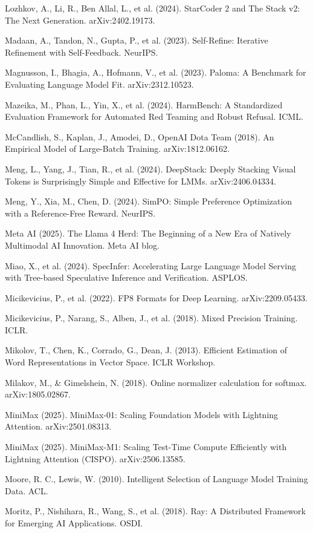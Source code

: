 {\begin{enumerate}[leftmargin=*,itemsep=1pt,label={[\arabic*]}]
\item Lozhkov, A., Li, R., Ben Allal, L., et al. (2024). StarCoder 2 and The Stack v2: The Next Generation. arXiv:2402.19173.
\item Madaan, A., Tandon, N., Gupta, P., et al. (2023). Self-Refine: Iterative Refinement with Self-Feedback. NeurIPS.
\item Magnusson, I., Bhagia, A., Hofmann, V., et al. (2023). Paloma: A Benchmark for Evaluating Language Model Fit. arXiv:2312.10523.
\item Mazeika, M., Phan, L., Yin, X., et al. (2024). HarmBench: A Standardized Evaluation Framework for Automated Red Teaming and Robust Refusal. ICML.
\item McCandlish, S., Kaplan, J., Amodei, D., OpenAI Dota Team (2018). An Empirical Model of Large-Batch Training. arXiv:1812.06162.
\item Meng, L., Yang, J., Tian, R., et al. (2024). DeepStack: Deeply Stacking Visual Tokens is Surprisingly Simple and Effective for LMMs. arXiv:2406.04334.
\item Meng, Y., Xia, M., Chen, D. (2024). SimPO: Simple Preference Optimization with a Reference-Free Reward. NeurIPS.
\item Meta AI (2025). The Llama 4 Herd: The Beginning of a New Era of Natively Multimodal AI Innovation. Meta AI blog.
\item Miao, X., et al. (2024). SpecInfer: Accelerating Large Language Model Serving with Tree-based Speculative Inference and Verification. ASPLOS.
\item Micikevicius, P., et al. (2022). FP8 Formats for Deep Learning. arXiv:2209.05433.
\item Micikevicius, P., Narang, S., Alben, J., et al. (2018). Mixed Precision Training. ICLR.
\item Mikolov, T., Chen, K., Corrado, G., Dean, J. (2013). Efficient Estimation of Word Representations in Vector Space. ICLR Workshop.
\item Milakov, M., \& Gimelshein, N. (2018). Online normalizer calculation for softmax. arXiv:1805.02867.
\item MiniMax (2025). MiniMax-01: Scaling Foundation Models with Lightning Attention. arXiv:2501.08313.
\item MiniMax (2025). MiniMax-M1: Scaling Test-Time Compute Efficiently with Lightning Attention (CISPO). arXiv:2506.13585.
\item Moore, R. C., Lewis, W. (2010). Intelligent Selection of Language Model Training Data. ACL.
\item Moritz, P., Nishihara, R., Wang, S., et al. (2018). Ray: A Distributed Framework for Emerging AI Applications. OSDI.

\end{enumerate}}
